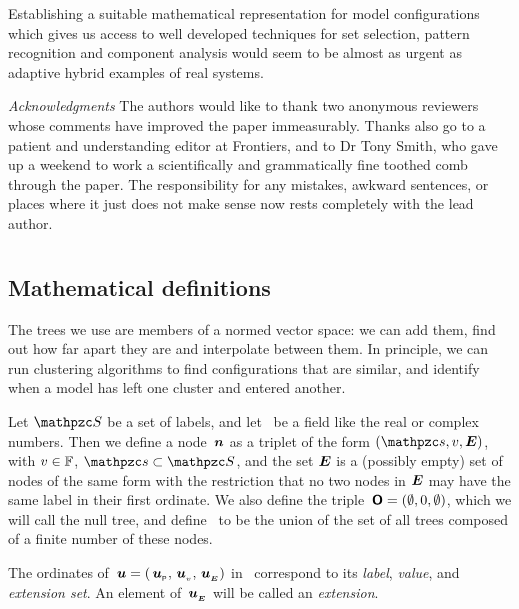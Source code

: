 Establishing a suitable math\-e\-mat\-i\-cal represen\-tation for model
con\-fig\-ur\-a\-tions which gives us access to well developed techniques for
set selection, pattern recognition and component analysis would seem
to be almost as urgent as adaptive hybrid examples of real systems.


\noindent\emph{Acknowledgments}\linebreak
The authors would like to thank two anonymous reviewers whose comments
have improved the paper immeasurably.  Thanks also go to a patient and
understanding editor at Frontiers, and to Dr Tony Smith, who gave up a
weekend to work a scientifically and grammatically fine toothed comb
through the paper.  The responsibility for any mistakes, awkward
sentences, or places where it just does not make sense now rests
completely with the lead author.







\appendix



\onecolumn

\section*{\appendixname}
\subsection*{Mathematical definitions}
\label{AppTrees}
The trees we use are members of a normed vector space: we can add
them, find out how far apart they are and interpolate between them. In
principle, we can run clustering algorithms to find con\-fig\-ur\-a\-tions
that are similar, and identify when a model has left one cluster and
entered another.


\begin{definition}
  \label{defdomain}
  Let $\mc{S}$ be a set of labels, and let \TFIELD\ be a field like
  the real or complex numbers. Then we define a node $\,\boldsymbol{n}$ as a
  triplet of the form $(\mc{s}, v, \set{E})$, with $v \in \mathbb{F}$,
  $\mc{s} \subset \mc{S}$, and the set $\boldsymbol{E}$ is a (possibly empty)
  set of nodes of the same form with the restriction that no two nodes
  in $\boldsymbol{E}$ may have the same label in their first ordinate.  We
  also define the triple $\,\boldsymbol{\mathsf{O}} = (\emptyset, 0, \emptyset)$,
  which we will call the null tree, and define \TDOM\ to be the union
  of the set of all trees composed of a finite number of these nodes.

  The ordinates of $\,\boldsymbol{u} = ({\,\boldsymbol{u}}_{{}_{\mathsf{P}}}, {\,\boldsymbol{u}}_{{}_{v}}, {\,\boldsymbol{u}}_{{}_{\boldsymbol{E}}})$ in
  \TDOM\ correspond to its \emph{label}, \emph{value}, and
  \emph{extension set}.  An element of ${\,\boldsymbol{u}}_{{}_{\boldsymbol{E}}}$ will be called an
  \emph{extension}.
\end{definition}


